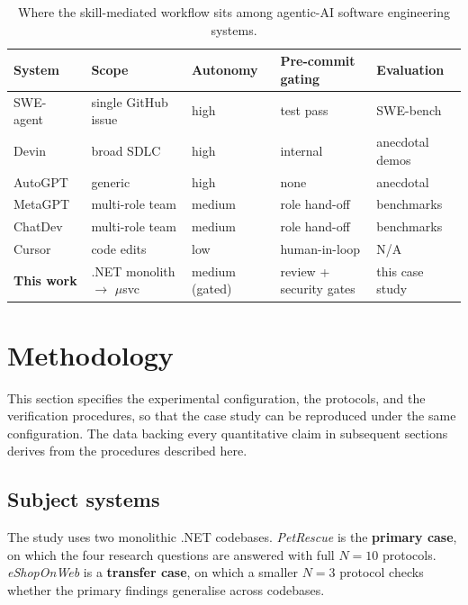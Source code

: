 \documentclass[journal]{IEEEtran}
\begin{document}
\begin{table}[t]
\caption{Where the skill-mediated workflow sits among agentic-AI software
engineering systems.}
\label{tab:related-systems}
\centering
\begin{tabular}{lllll}
\toprule
System & Scope & Autonomy & Pre-commit gating & Evaluation \\
\midrule
SWE-agent~\cite{yang2024sweagent}     & single GitHub issue   & high     & test pass         & SWE-bench \\
Devin~\cite{cognition2024devin}       & broad SDLC            & high     & internal          & anecdotal demos \\
AutoGPT~\cite{autogpt2023}            & generic               & high     & none              & anecdotal \\
MetaGPT~\cite{hong2024metagpt}        & multi-role team       & medium   & role hand-off     & benchmarks \\
ChatDev~\cite{qian2024chatdev}        & multi-role team       & medium   & role hand-off     & benchmarks \\
Cursor~\cite{cursor2024}              & code edits            & low      & human-in-loop     & N/A \\
\textbf{This work}                    & .NET monolith $\to$ $\mu$svc & medium (gated) & review + security gates & this case study \\
\bottomrule
\end{tabular}
\end{table}

\section{Methodology}
\label{sec:method}

This section specifies the experimental configuration, the protocols,
and the verification procedures, so that the case study can be
reproduced under the same configuration. The data backing every
quantitative claim in subsequent sections derives from the procedures
described here.

\subsection{Subject systems}
\label{sec:method-subjects}

The study uses two monolithic .NET codebases. \textit{PetRescue} is
the \textbf{primary case}, on which the four research questions are
answered with full $N{=}10$ protocols. \textit{eShopOnWeb} is a
\textbf{transfer case}, on which a smaller $N{=}3$ protocol checks
whether the primary findings generalise across codebases.
\end{document}
